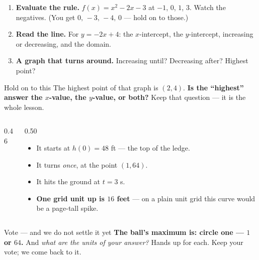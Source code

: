 \documentclass[aspectratio=169, 11pt]{beamer}
\newcommand{\pgrid}{%
  \draw[step=0.5, linegray!40, very thin] (0,0) grid (3.5,4.5);
  \draw[->, thick, charcoal] (0,0)--(3.9,0) node[below right, font=\tiny]{$t$ (s)};
  \draw[->, thick, charcoal] (0,0)--(0,5.0) node[left, font=\tiny]{$h$ (ft)};
  \foreach \x in {1,2,3}{\node[below, font=\tiny, charcoal] at (\x,0){$\x$};}
  \foreach \y/\lab in {1/16,2/32,3/48,4/64}{\node[left, font=\tiny, charcoal] at (0,\y){$\lab$};}}
\newcommand{\fdot}[3]{\fill[#1] (#2,#3) circle (3.0pt);}
\begin{document}
\begin{frame}[t, plain]
  \begin{enumerate}\setlength{\itemsep}{7pt}
    \item \textbf{Evaluate the rule.} $f(x)=x^2-2x-3$ at $-1$, $0$, $1$, $3$. Watch the
          negatives. \; (You get $0,\,-3,\,-4,\,0$ --- hold on to those.)
    \item \textbf{Read the line.} For $y=-2x+4$: the $x$-intercept, the $y$-intercept,
          increasing or decreasing, and the domain.
    \item \textbf{A graph that turns around.} Increasing until? Decreasing after? Highest point?
  \end{enumerate}
  \vspace{6pt}
  \begin{block}{Hold on to this}
    The highest point of that graph is $(2,4)$. \textbf{Is the ``highest'' answer the $x$-value,
    the $y$-value, or both?} Keep that question --- it is the whole lesson.
  \end{block}
\end{frame}

\begin{frame}[t, plain]
  \begin{columns}[T]
    \begin{column}{0.46\textwidth}
      \centering
    \end{column}
    \begin{column}{0.50\textwidth}
      \begin{itemize}\setlength{\itemsep}{4pt}
        \item It starts at $h(0)=48$ ft --- the top of the ledge.
        \item It turns \emph{once}, at the point $(1,64)$.
        \item It hits the ground at $t=3$ s.
        \item \textbf{One grid unit up is $16$ feet} --- on a plain unit grid this curve would be
              a page-tall spike.
      \end{itemize}
    \end{column}
  \end{columns}
  \vspace{2pt}
  \begin{block}{Vote --- and we do not settle it yet}
    \textbf{The ball's maximum is: circle one --- $1$ or $64$.} \quad And \emph{what are the units
    of your answer?} Hands up for each. Keep your vote; we come back to it.
  \end{block}
\end{frame}
\end{document}
